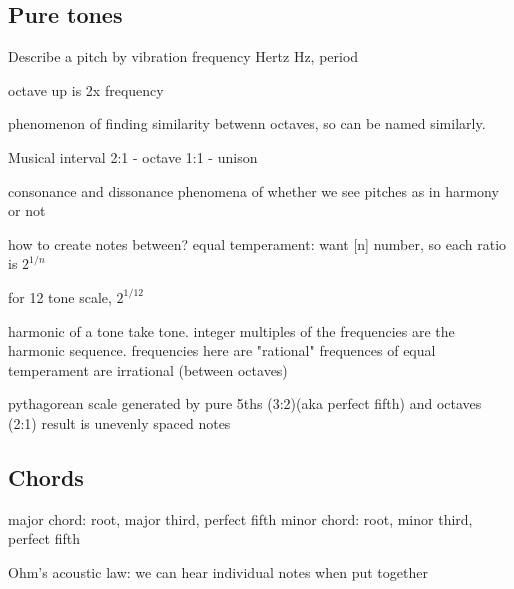 
\subsection{Pure tones}

Describe a pitch by vibration
frequency Hertz Hz, period

octave up is 2x frequency

phenomenon of finding similarity betwenn octaves, so can be named similarly.

Musical interval
2:1 - octave
1:1 - unison


consonance and dissonance
phenomena of whether we see pitches as in harmony or not

how to create notes between?
equal temperament:
want [n] number, so each ratio is \(2^{1/n}\)

for 12 tone scale, \(2^{1/12}\)

harmonic of a tone
take tone. integer multiples of the frequencies are the harmonic sequence.
frequencies here are "rational"
frequences of equal temperament are irrational (between octaves)

pythagorean scale
generated by pure 5ths (3:2)(aka perfect fifth)  and octaves (2:1)
result is unevenly spaced notes

\subsection{Chords}

major chord: root, major third, perfect fifth
minor chord: root, minor third, perfect fifth

Ohm's acoustic law: we can hear individual notes when put together
